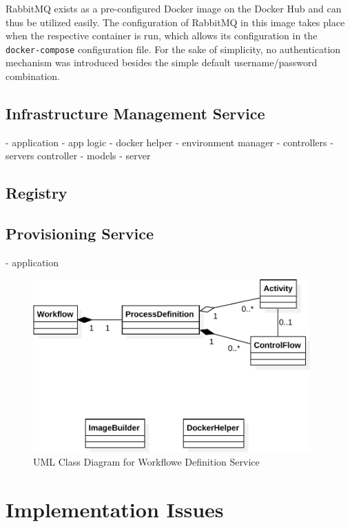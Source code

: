       RabbitMQ exists as a pre-configured Docker image on the Docker Hub and can thus be utilized easily. The configuration of RabbitMQ in this image takes place when the respective container is run, which allows its configuration in the \texttt{docker-compose} configuration file.
      For the sake of simplicity, no authentication mechanism was introduced besides the simple default username/password combination.

  \subsection{Infrastructure Management Service} %
    \label{sub:infrastructure_management_service}
      - application
        - app logic
          - docker helper
          - environment manager
        - controllers
          - servers controller
        - models
          - server


  \subsection{Registry} %
    \label{sub:registry}

  \subsection{Provisioning Service} %
    \label{sub:provisioning_service}
      - application


\begin{figure}[htbp]
  \centering
  \includegraphics[width=0.95\textwidth]{content/images/class_d_definition-crop.pdf}
  \caption{UML Class Diagram for Workflowe Definition Service}
  \label{fig:uml_class_diagram_definition_service}
\end{figure}

\section{Implementation Issues} %
\label{sec:implementation_issues}

